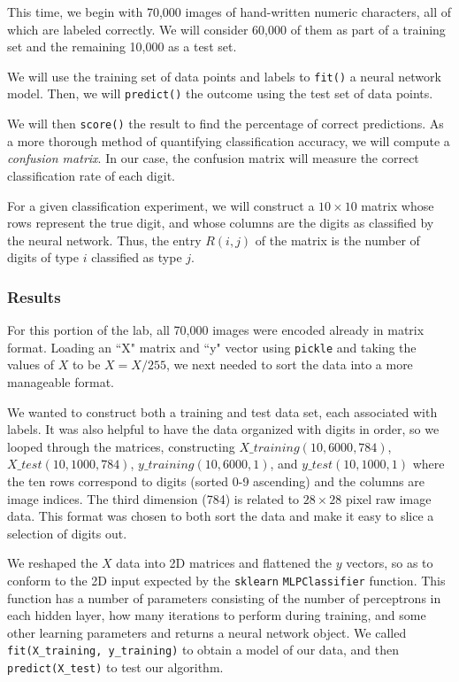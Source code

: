\documentclass[11pt,a4paper]{article}
\begin{document}
This time, we begin with 70,000 images of hand-written numeric characters, all of which are labeled correctly. We will consider 60,000 of them as part of a training set and the remaining 10,000 as a test set.

We will use the training set of data points and labels to \verb|fit()| a neural network model. Then, we will \verb|predict()| the outcome using the test set of data points.

We will then \verb|score()| the result to find the percentage of correct predictions. As a more thorough method of quantifying classification accuracy, we will compute a \textit{confusion matrix}. In our case, the confusion matrix will measure the correct classification rate of each digit.

For a given classification experiment, we will construct a $10 \times 10$ matrix whose rows represent the true digit, and whose columns are the digits as classified by the neural network. Thus, the entry $R(i,j)$ of the matrix is the number of digits of type $i$ classified as type $j$.


\subsubsection{Results}
For this portion of the lab, all 70,000 images were encoded already in matrix format. Loading an ``X" matrix and ``y" vector using \verb|pickle| and taking the values of $X$ to be $X = X/255$, we next needed to sort the data into a more manageable format. 

We wanted to construct both a training and test data set, each associated with labels. It was also helpful to have the data organized with digits in order, so we looped through the matrices, constructing $X\_training(10,6000,784)$, $X\_test(10, 1000, 784)$, $y\_training(10, 6000, 1)$, and $y\_test(10, 1000, 1)$ where the ten rows correspond to digits (sorted 0-9 ascending) and the columns are image indices. The third dimension (784) is related to $28 \times 28$ pixel raw image data. This format was chosen to both sort the data and make it easy to slice a selection of digits out.

We reshaped the $X$ data into 2D matrices and flattened the $y$ vectors, so as to conform to the 2D input expected by the \verb|sklearn| \verb|MLPClassifier| function. This function has a number of parameters consisting of the number of perceptrons in each hidden layer, how many iterations to perform during training, and some other learning parameters and returns a neural network object. We called \verb|fit(X_training, y_training)| to obtain a model of our data, and then \verb|predict(X_test)| to test our algorithm.
\end{document}
